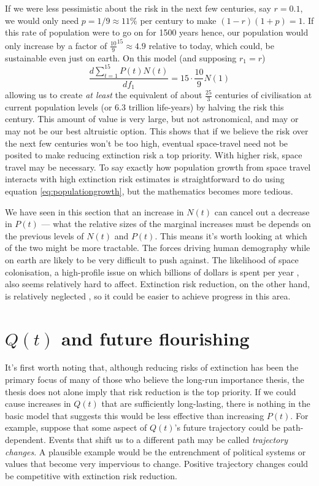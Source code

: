 \documentclass[british]{article}
\begin{document}
If we were less pessimistic about the risk in the next few centuries, say $r=0.1$, we would only need $p=1/9\approx11\%$ per century to make $(1-r)(1+p)=1$. If this rate of population were to go on for 1500 years hence, our population would only increase by a factor of $\frac{10}{9}^{15} \approx 4.9$ relative to today, which could, be sustainable even just on earth. On this model (and supposing $r_1=r$)
$$\frac{d\sum_{t=1}^{15} P(t)N(t)}{df_1}=15 \cdot \frac{10}{9}N(1)$$
allowing us to create \emph{at least} the equivalent of about $\frac{25}{3}$ centuries of civilisation at current population levels (or 6.3 trillion life-years) by halving the risk this century. This amount of value is very large, but not astronomical, and may or may not be our best altruistic option. This shows that if we believe the risk over the next few centuries won't be too high, eventual space-travel need not be posited to make reducing extinction risk a top priority. With higher risk, space travel may be necessary. To say exactly how population growth from space travel interacts with high extinction risk estimates is straightforward to do using equation \ref{eq:populationgrowth}, but the mathematics becomes more tedious. 

We have seen in this section that an increase in $N(t)$ can cancel out a decrease in $P(t)$ --- what the relative sizes of the marginal increases must be depends on the previous levels of $N(t)$ and $P(t)$. This means it's worth looking at which of the two might be more tractable. The forces driving human demography while on earth are likely to be very difficult to push against. The likelihood of space colonisation, a high-profile issue on which billions of dollars is spent per year \citep{masters_how_2015-1}, also seems relatively hard to affect. Extinction risk reduction, on the other hand, is relatively neglected \citep{bostrom_existential_2013,todd_case_2017}, so it could be easier to achieve progress in this area.

\section{$Q(t)$ and future flourishing}\label{qt}
It's first worth noting that, although reducing risks of extinction has been the primary focus of many of those who believe the long-run importance thesis, the thesis does not alone imply that risk reduction is the top priority. If we could cause increases in $Q(t)$ that are sufficiently long-lasting, there is nothing in the basic model that suggests this would be less effective than increasing $P(t)$. For example, suppose that some aspect of $Q(t)$'s future trajectory could be path-dependent. Events that shift us to a different path may be called \emph{trajectory changes}. A plausible example would be the entrenchment of political systems or values that become very impervious to change. Positive trajectory changes could be competitive with extinction risk reduction.
\end{document}
